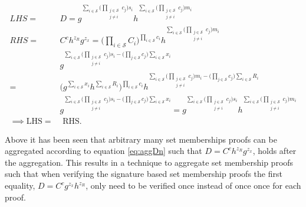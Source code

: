 \begin{align*}
LHS =& D = g ^ {\sum_{i\in\mathcal{S}} \Big(\prod_{\substack{j\in\mathcal{S}\\ j\neq i}}   c_j \Big)s_i} h^ {\sum_{i\in\mathcal{S}} \Big(\prod_{\substack{j\in\mathcal{S}\\ j\neq i}}    c_j \Big)m_i}  
\\
RHS =& C^ch^{z_R}g^{z_x} =  \Big( \prod_{i\in\mathcal{S}} C_i \Big)^{\prod_{i\in\mathcal{S}} c_i}h^ {\sum_{i\in\mathcal{S}} \Big( \prod_{\substack{j\in\mathcal{S}\\ j\neq i}}   c_j \Big)m_i}
\\
&g^{ \sum_{i\in\mathcal{S}} \Big( \prod_{\substack{j\in\mathcal{S}\\ j\neq i}}   c_j \Big)s_i - \big( \prod_{j\in\mathcal{S}} c_j \big) \sum_{i\in\mathcal{S}} x_i}
\\ 
 =& \Big( g^{\sum_{i\in\mathcal{S}} x_i} h^{\sum_{i\in\mathcal{S}} R_i}\Big)^{\prod_{i\in\mathcal{S}} c_i} h^{ \sum_{i\in\mathcal{S}} \Big( \prod_{\substack{j\in\mathcal{S}\\ j\neq i}} c_j \Big)m_i - \big( \prod_{j\in\mathcal{S}} c_j \Big) \sum_{i\in\mathcal{S}} R_i  }
 \\
 &g^{ \sum_{i\in\mathcal{S}} \Big( \prod_{\substack{j\in\mathcal{S}\\ j\neq i}}   c_j \Big)s_i - \big( \prod_{j\in\mathcal{S}} c_j \big) \sum_{i\in\mathcal{S}} x_i}=  g^{ \sum_{i\in\mathcal{S}} \Big( \prod_{\substack{j\in\mathcal{S}\\ j\neq i}}  c_j \Big)s_i } h^{\sum_{i\in\mathcal{S}} \Big( \prod_{\substack{j\in\mathcal{S}\\ j\neq i}}   c_j \Big)m_i}  
\\
 \implies \text{LHS} =& \text{ RHS}.
\end{align*}



Above it has been seen that arbitrary many set memberships proofs can be aggregated according to equation \eqref{eq:aggDn} such that $D=C^ch^{z_R}g^{z_x}$,  holds after the aggregation. This results in a technique to aggregate  set membership proofs such that when verifying the signature based set membership proofs the first equality, $D=C^cg^{z_x}h^{z_R}$, only need to be verified once instead of once once for each proof.

